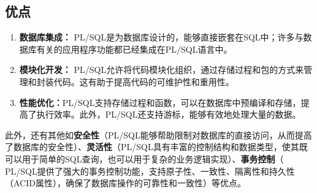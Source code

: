 \documentclass[11pt, a4paper, oneside, UTF8]{ctexbook}
\let\kaishu\relax %
\begin{document}
\subsection{优点}
\begin{enumerate}
  \item {\bfseries\kaishu 数据库集成：} PL/SQL是为数据库设计的，能够直接嵌套在SQL中；许多与数据库有关的应用程序功能都已经集成在PL/SQL语言中。
  \item {\bfseries\kaishu 模块化开发：} PL/SQL允许将代码模块化组织，通过存储过程和包的方式来管理和封装代码。这有助于提高代码的可维护性和重用性。
  \item {\bfseries\kaishu 性能优化：}PL/SQL支持存储过程和函数，可以在数据库中预编译和存储，提高了执行效率。此外，PL/SQL还支持游标，能够有效地处理大量的数据。
\end{enumerate}
此外，还有其他如\textbf{安全性}（PL/SQL能够帮助限制对数据库的直接访问，从而提高了数据库的安全性）、\textbf{灵活性}（PL/SQL具有丰富的控制结构和数据类型，使其既可以用于简单的SQL查询，也可以用于复杂的业务逻辑实现）、\textbf{事务控制}（ PL/SQL提供了强大的事务控制功能，支持原子性、一致性、隔离性和持久性（ACID属性），确保了数据库操作的可靠性和一致性）等优点。
\end{document}
